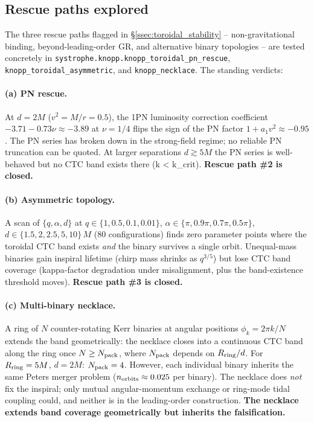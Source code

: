 \documentclass[11pt,a4paper]{article}
\begin{document}
\subsection{Rescue paths explored}\label{ssec:toroidal_rescue}

The three rescue paths flagged in \S\ref{ssec:toroidal_stability} -- non-gravitational binding, beyond-leading-order GR, and alternative binary topologies -- are tested concretely in \texttt{systrophe.knopp.knopp\_toroidal\_pn\_rescue}, \texttt{knopp\_toroidal\_asymmetric}, and \texttt{knopp\_necklace}. The standing verdicts:

\paragraph{(a) PN rescue.} At $d=2M$ ($v^{2}=M/r=0.5$), the 1PN luminosity correction coefficient $-3.71-0.73\nu\approx-3.89$ at $\nu=1/4$ flips the sign of the PN factor $1+a_{1}v^{2}\approx-0.95$. The PN series has broken down in the strong-field regime; no reliable PN truncation can be quoted. At larger separations $d\!\gtrsim\!5M$ the PN series is well-behaved but no CTC band exists there (k < k_crit). \textbf{Rescue path \#2 is closed.}

\paragraph{(b) Asymmetric topology.} A scan of $\{q,\alpha,d\}$ at $q\in\{1,0.5,0.1,0.01\}$, $\alpha\in\{\pi,0.9\pi,0.7\pi,0.5\pi\}$, $d\in\{1.5,2,2.5,5,10\}\,M$ (80 configurations) finds zero parameter points where the toroidal CTC band exists \emph{and} the binary survives a single orbit. Unequal-mass binaries gain inspiral lifetime (chirp mass shrinks as $q^{3/5}$) but lose CTC band coverage (kappa-factor degradation under misalignment, plus the band-existence threshold moves). \textbf{Rescue path \#3 is closed.}

\paragraph{(c) Multi-binary necklace.} A ring of $N$ counter-rotating Kerr binaries at angular positions $\phi_{k}=2\pi k/N$ extends the band geometrically: the necklace closes into a continuous CTC band along the ring once $N \geq N_{\rm pack}$, where $N_{\rm pack}$ depends on $R_{\rm ring}/d$. For $R_{\rm ring}=5M$, $d=2M$: $N_{\rm pack}=4$. However, each individual binary inherits the same Peters merger problem ($n_{\rm orbits}\approx 0.025$ per binary). The necklace does \emph{not} fix the inspiral; only mutual angular-momentum exchange or ring-mode tidal coupling could, and neither is in the leading-order construction. \textbf{The necklace extends band coverage geometrically but inherits the falsification.}
\end{document}
